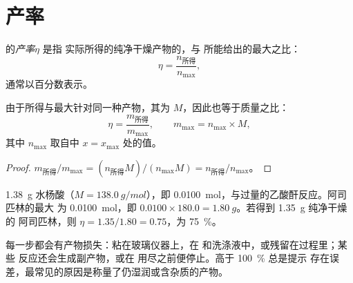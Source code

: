 \section{产率}

\begin{definition}[产率]\label{def:g10:synthesis-yield:yield}
的\emph{产率}$\eta$ 是指
实际所得的纯净干燥产物的，与
所能给出的最大之比：
\[
  \eta = \frac{n_{\text{所得}}}{n_{\max}} ,
\]
通常以百分数表示。
\end{definition}

\begin{proposition}[由质量求产率]\label{prop:g10:synthesis-yield:masses}
由于所得与最大针对同一种产物，其为 $M$，因此也等于质量之比：
\[
  \eta = \frac{m_{\text{所得}}}{m_{\max}},
  \qquad m_{\max} = n_{\max} \times M,
\]
其中 $n_{\max}$ 取自中 $x = x_{\max}$ 处的值。
\end{proposition}

\begin{proof}
$m_{\text{所得}} / m_{\max} = (n_{\text{所得}} M) / (n_{\max} M)
= n_{\text{所得}} / n_{\max}$。
\end{proof}

\begin{example}[小规模合成的产率]\label{ex:g10:synthesis-yield:small}
\qty{1.38}{g} 水杨酸（$M = \qty{138.0}{g/mol}$），即
\qty{0.0100}{mol}，与过量的乙酸酐反应。阿司匹林的最大
为 \qty{0.0100}{mol}，即
$0.0100 \times 180.0 = \qty{1.80}{g}$。若得到 \qty{1.35}{g} 纯净干燥的
阿司匹林，则 $\eta = 1.35 / 1.80 = 0.75$，为
\qty{75}{\percent}。
\end{example}

\begin{remark}[产率为何低于 100 \%]\label{rem:g10:synthesis-yield:below}
每一步都会有产物损失：粘在玻璃仪器上，在
和洗涤液中，或残留在过程里；某些
反应还会生成副产物，或在
用尽之前便停止。高于 \qty{100}{\percent} 总是提示
存在误差，最常见的原因是称量了仍湿润或含杂质的产物。
\end{remark}

